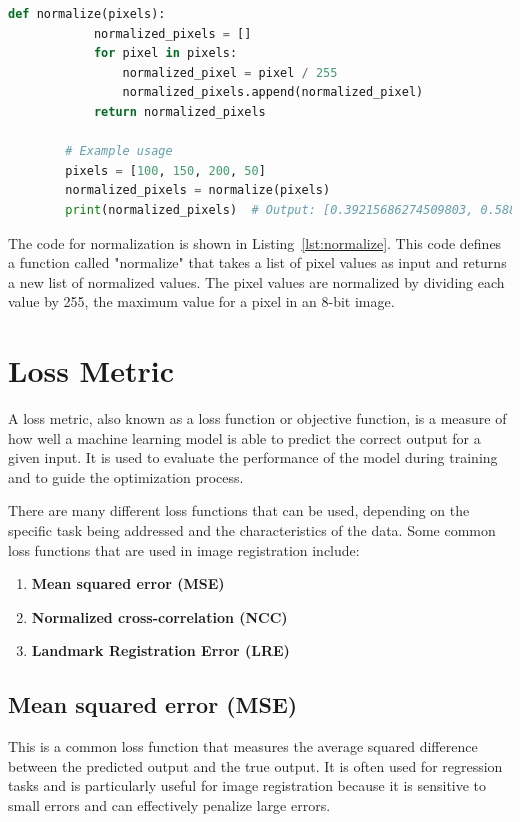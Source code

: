 \documentclass{report}
\begin{document}
	\begin{lstlisting}[language=python, label=lst:normalize, caption=Pseudo function to show the normalization of pixel intensity values.]
		def normalize(pixels):
			normalized_pixels = []
			for pixel in pixels:
				normalized_pixel = pixel / 255
				normalized_pixels.append(normalized_pixel)
			return normalized_pixels
	
		# Example usage
		pixels = [100, 150, 200, 50]
		normalized_pixels = normalize(pixels)
		print(normalized_pixels)  # Output: [0.39215686274509803, 0.5882352941176471, 0.7843137254901961, 0.19607843137254902]
	\end{lstlisting}
	
	The code for normalization is shown in Listing~\ref{lst:normalize}. This code defines a function called "normalize" that takes a list of pixel values as input and returns a new list of normalized values. The pixel values are normalized by dividing each value by 255, the maximum value for a pixel in an 8-bit image.
	
	\section{Loss Metric}\label{sec:loss_metric}
	A loss metric, also known as a loss function or objective function, is a measure of how well a machine learning model is able to predict the correct output for a given input. It is used to evaluate the performance of the model during training and to guide the optimization process.
	
	There are many different loss functions that can be used, depending on the specific task being addressed and the characteristics of the data. Some common loss functions that are used in image registration include:
	
	\begin{enumerate}
		\item \textbf{Mean squared error (MSE)}
		\item \textbf{Normalized cross-correlation (NCC)}
		\item \textbf{Landmark Registration Error (LRE)}
	\end{enumerate}
	
	\subsection{Mean squared error (MSE)}
	This is a common loss function that measures the average squared difference between the predicted output and the true output. It is often used for regression tasks and is particularly useful for image registration because it is sensitive to small errors and can effectively penalize large errors.
	
\end{document}
